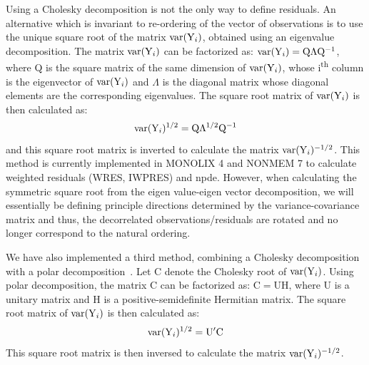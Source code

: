 Using a Cholesky decomposition is not the only way to define residuals. An alternative which is invariant to 
re-ordering of the vector of observations is to use the unique square root of the matrix $\hbox{var}({\rm Y}_{i})$, obtained 
using an eigenvalue decomposition. The matrix $\hbox{var}({\rm Y}_i)$ can be factorized as: $\hbox{var}({\rm Y}_{i})= \mathrm{Q} \Lambda 
\mathrm{Q}^{-1}$, where Q is the square matrix of the same dimension of $\hbox{var}({\rm Y}_i)$, whose i\textsuperscript{th} 
column is the eigenvector of $\hbox{var}({\rm Y}_i)$ and $\Lambda$ is the diagonal matrix whose diagonal elements are the 
corresponding eigenvalues. The square root matrix of $\hbox{var}({\rm Y}_i)$ is then calculated as: $$\hbox{var}({\rm Y}_i)^{1/2} = 
\mathrm{Q} \Lambda^{1/2} \mathrm{Q}^{-1}$$ and this square root matrix is inverted to calculate the matrix 
$\hbox{var}({\rm Y}_i)^{-1/2}$. This method is currently implemented in MONOLIX 4 and NONMEM 7 to calculate weighted residuals 
(WRES, IWPRES) and npde. However, when calculating the symmetric square root from the eigen value-eigen vector 
decomposition, we will essentially be defining principle directions determined by the variance-covariance matrix 
and thus, the decorrelated observations/residuals are rotated and no longer correspond to the natural ordering.

We have also implemented a third method, combining a Cholesky decomposition with a polar 
decomposition~\cite{Higham86}. Let $\mathrm{C}$ denote the Cholesky root of $\hbox{var}({\rm Y}_i)$. Using polar 
decomposition, the matrix $\mathrm{C}$ can be factorized as: $\mathrm{C} = \mathrm{U} \mathrm{H}$, where U is a 
unitary matrix and H is a positive-semidefinite Hermitian matrix. The square root matrix of $\hbox{var}({\rm Y}_i)$ is then 
calculated as: $$\hbox{var}({\rm Y}_i)^{1/2} = \mathrm{U}' \mathrm{C}$$ This square root matrix is then inversed to calculate 
the matrix $\hbox{var}({\rm Y}_i)^{-1/2}$.


